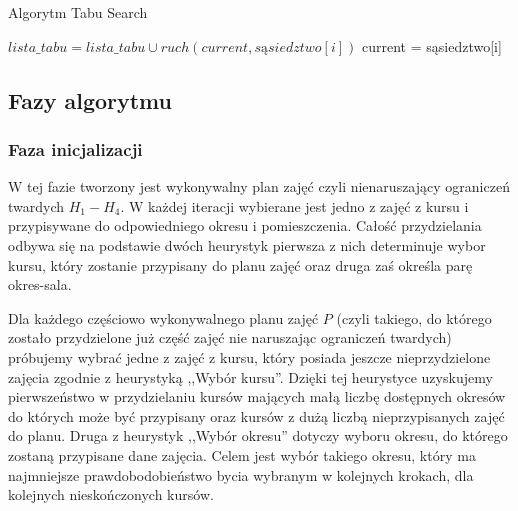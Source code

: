 \begin{algorithm}[H]
    \caption{Algorytm Tabu Search}
    \begin{algorithmic}
    	\STATE $lista\_tabu = lista\_tabu \cup ruch(current, sąsiedztwo[i])$
    	\STATE current = sąsiedztwo[i]
    	\ENDIF
    \ENDFOR
    \ENDWHILE
    \end{algorithmic}
    \end{algorithm}

\subsection{Fazy algorytmu}
\subsubsection{Faza inicjalizacji}
\par W tej fazie tworzony jest wykonywalny plan zajęć czyli nienaruszający ograniczeń twardych ${H_{1} - H_{4}}$. W każdej iteracji wybierane jest jedno z zajęć z kursu i przypisywane do odpowiedniego okresu i pomieszczenia. Całość przydzielania odbywa się na podstawie dwóch heurystyk pierwsza z nich determinuje wybor kursu, który zostanie przypisany do planu zajęć oraz druga zaś określa parę okres-sala.
\par Dla każdego częściowo wykonywalnego planu zajęć ${P}$ (czyli takiego, do którego zostało przydzielone już część zajęć nie naruszając ograniczeń twardych) próbujemy wybrać jedne z zajęć z kursu, który posiada jeszcze nieprzydzielone zajęcia zgodnie z heurystyką ,,Wybór kursu''. Dzięki tej heurystyce uzyskujemy pierwszeństwo w przydzielaniu kursów mających małą liczbę dostępnych okresów do których może być przypisany oraz kursów z dużą liczbą nieprzypisanych zajęć do planu. Druga z heurystyk ,,Wybór okresu'' dotyczy wyboru okresu, do którego zostaną przypisane dane zajęcia. Celem jest wybór takiego okresu, który ma najmniejsze prawdobodobieństwo bycia wybranym w kolejnych krokach, dla kolejnych nieskończonych kursów.

